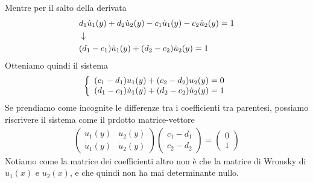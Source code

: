Mentre per il salto della derivata
\begin{align}
	&d_1 \dot{u}_1 (y) + d_2 \dot{u}_2 (y) - c_1 \dot{u}_1 (y) - c_2 \dot{u}_2 (y) = 1 \\ &\downarrow \nonumber \\
	&(d_1 - c_1)\dot{u}_1 (y) + (d_2 - c_2)\dot{u}_2 (y) = 1 
\end{align}
Otteniamo quindi il sistema
\begin{align}
	\left\{ \begin{array}{cc} (c_1 - d_1) u_1 (y) +(c_2 - d_2)u_2 (y) =0\\ (d_1 - c_1)\dot{u}_1 (y) + (d_2 - c_2)\dot{u}_2 (y) = 1 \end{array} \right.
\end{align}
Se prendiamo come incognite le differenze tra i coefficienti tra parentesi, possiamo riscrivere il sistema come il prdotto matrice-vettore
\begin{align}
	\begin{pmatrix}
		u_1 (y) & u_2 (y)\\
		\dot{u}_1 (y) & \dot{u}_2 (y)
	\end{pmatrix} \left( \begin{array}{c}
		c_1 - d_1\\
		c_2 - d_2
	\end{array} \right) = \left( \begin{array}{c}
		0\\
		1
	\end{array} \right)
\end{align}
Notiamo come la matrice dei coefficienti altro non è che la matrice di Wronsky di $u_1(x)$ e $u_2(x)$, e che quindi non ha mai determinante nullo. 

